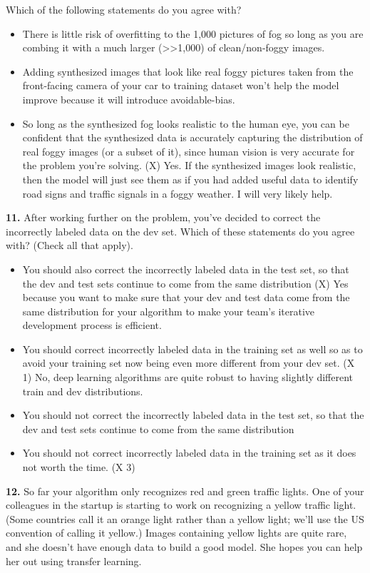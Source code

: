 Which of the following statements do you agree with?
\begin{itemize}
    \item There is little risk of overfitting to the 1,000 pictures of fog so long as you are combing it with a much larger (>>1,000) of clean/non-foggy images.
    \item Adding synthesized images that look like real foggy pictures taken from the front-facing camera of your car to training dataset won’t help the model improve because it will introduce avoidable-bias.
    \item So long as the synthesized fog looks realistic to the human eye, you can be confident that the synthesized data is accurately capturing the distribution of real foggy images (or a subset of it), since human vision is very accurate for the problem you’re solving. (X) Yes. If the synthesized images look realistic, then the model will just see them as if you had added useful data to identify road signs and traffic signals in a foggy weather. I will very likely help.
\end{itemize}
\textbf{11.} After working further on the problem, you’ve decided to correct the incorrectly labeled data on the dev set. Which of these statements do you agree with? (Check all that apply).
\begin{itemize}
    \item You should also correct the incorrectly labeled data in the test set, so that the dev and test sets continue to come from the same distribution (X) Yes because you want to make sure that your dev and test data come from the same distribution for your algorithm to make your team’s iterative development process is efficient.
    \item You should correct incorrectly labeled data in the training set as well so as to avoid your training set now being even more different from your dev set. (X 1) No, deep learning algorithms are quite robust to having slightly different train and dev distributions.
    \item You should not correct the incorrectly labeled data in the test set, so that the dev and test sets continue to come from the same distribution
    \item You should not correct incorrectly labeled data in the training set as it does not worth the time. (X 3)
\end{itemize}
\textbf{12.} So far your algorithm only recognizes red and green traffic lights. One of your colleagues in the startup is starting to work on recognizing a yellow traffic light. (Some countries call it an orange light rather than a yellow light; we’ll use the US convention of calling it yellow.) Images containing yellow lights are quite rare, and she doesn’t have enough data to build a good model. She hopes you can help her out using transfer learning.

